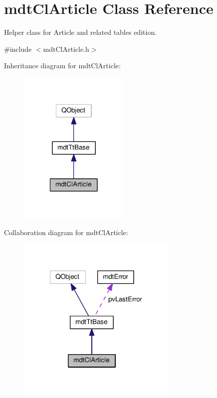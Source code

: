 \hypertarget{classmdt_cl_article}{\section{mdt\-Cl\-Article Class Reference}
\label{classmdt_cl_article}
}


Helper class for Article and related tables edition.  




{\ttfamily \#include $<$mdt\-Cl\-Article.\-h$>$}



Inheritance diagram for mdt\-Cl\-Article\-:\nopagebreak
\begin{figure}[H]
\begin{center}
\leavevmode
\includegraphics[width=150pt]{classmdt_cl_article__inherit__graph}
\end{center}
\end{figure}


Collaboration diagram for mdt\-Cl\-Article\-:\nopagebreak
\begin{figure}[H]
\begin{center}
\leavevmode
\includegraphics[width=218pt]{classmdt_cl_article__coll__graph}
\end{center}
\end{figure}
